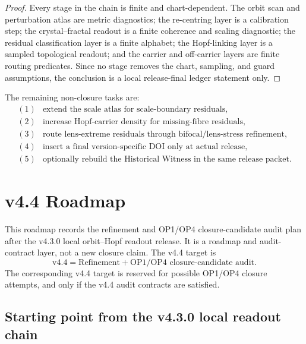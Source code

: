 \begin{proof}
Every stage in the chain is finite and chart-dependent.  The orbit scan and
perturbation atlas are metric diagnostics; the re-centring layer is a
calibration step; the crystal--fractal readout is a finite coherence and
scaling diagnostic; the residual classification layer is a finite alphabet;
the Hopf-linking layer is a sampled topological readout; and the carrier and
off-carrier layers are finite routing predicates.  Since no stage removes the
chart, sampling, and guard assumptions, the conclusion is a local
release-final ledger statement only.
\end{proof}

\begin{corollary}
\label{cor:next-release-tasks}
The remaining non-closure tasks are:
\[
\begin{array}{ll}
(1) & \text{extend the scale atlas for scale-boundary residuals},\\
(2) & \text{increase Hopf-carrier density for missing-fibre residuals},\\
(3) & \text{route lens-extreme residuals through bifocal/lens-stress refinement},\\
(4) & \text{insert a final version-specific DOI only at actual release},\\
(5) & \text{optionally rebuild the Historical Witness in the same release packet}.
\end{array}
\]
\end{corollary}



\section{v4.4 Roadmap}
\label{sec:v44-roadmap-refinement-op-audit}

This roadmap records the refinement and OP1/OP4 closure-candidate audit plan after the v4.3.0 local
orbit--Hopf readout release.  It is a roadmap and audit-contract layer, not a
new closure claim.  The v4.4 target is
\[
    \mathrm{v4.4}
    =
    \text{Refinement}
    +
    \text{OP1/OP4 closure-candidate audit}.
\]
The corresponding v4.4 target is reserved for possible OP1/OP4 closure
attempts, and only if the v4.4 audit contracts are satisfied.

\subsection{Starting point from the v4.3.0 local readout chain}
\label{subsec:v44-starting-point-v43-chain}

